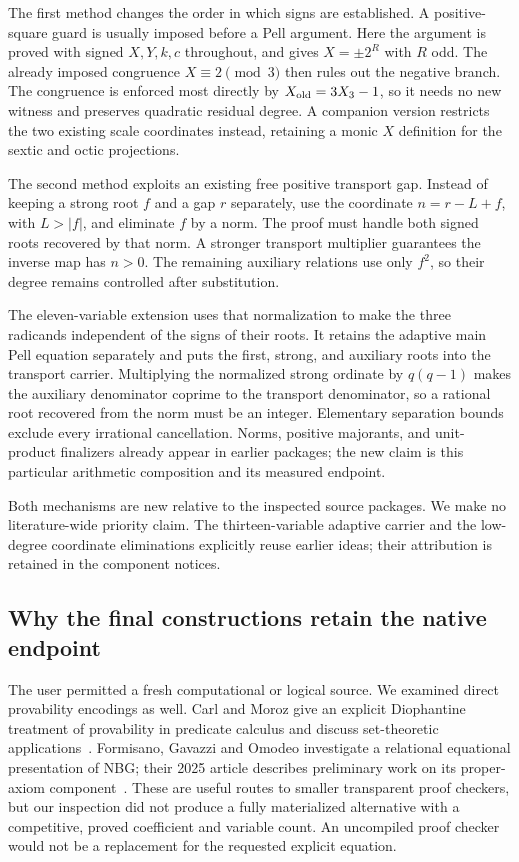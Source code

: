 \documentclass[11pt,letterpaper]{article}
\theoremstyle{remark}
\begin{document}
The first method changes the order in which signs are established.  A
positive-square guard is usually imposed before a Pell argument.  Here
the argument is proved with signed $X,Y,k,c$ throughout, and gives
$X=\pm2^R$ with $R$ odd.  The already imposed congruence
$X\equiv2\pmod3$ then rules out the negative branch.  The congruence is
enforced most directly by $X_{\rm old}=3X_3-1$, so it needs no
new witness and preserves quadratic residual degree.  A companion
version restricts the two existing scale coordinates instead, retaining
a monic $X$ definition for the sextic and octic projections.

The second method exploits an existing free positive transport gap.
Instead of keeping a strong root $f$ and a gap $r$ separately, use the
coordinate $n=r-L+f$, with $L>|f|$, and eliminate $f$ by a norm.  The
proof must handle both signed roots recovered by that norm.  A stronger
transport multiplier guarantees the inverse map has $n>0$.  The
remaining auxiliary relations use only $f^2$, so their degree remains
controlled after substitution.

The eleven-variable extension uses that normalization to make the three
radicands independent of the signs of their roots.  It retains the
adaptive main Pell equation separately and puts the first, strong, and
auxiliary roots into the transport carrier.  Multiplying the normalized
strong ordinate by $q(q-1)$ makes the auxiliary denominator coprime to
the transport denominator, so a rational root recovered from the norm
must be an integer.  Elementary separation bounds exclude every
irrational cancellation.  Norms, positive majorants, and unit-product
finalizers already appear in earlier packages; the new claim is this
particular arithmetic composition and its measured endpoint.

Both mechanisms are new relative to the inspected source packages.
We make no literature-wide priority claim.  The thirteen-variable
adaptive carrier and the low-degree coordinate eliminations explicitly
reuse earlier ideas; their attribution is retained in the component
notices.

\subsection{Why the final constructions retain the native endpoint}

The user permitted a fresh computational or logical source.  We examined
direct provability encodings as well.  Carl and Moroz give an explicit
Diophantine treatment of provability in predicate calculus and discuss
set-theoretic applications~\cite{carlmoroz}.  Formisano, Gavazzi and
Omodeo investigate a relational equational presentation of NBG; their
2025 article describes preliminary work on its proper-axiom
component~\cite{fgo}.  These are useful routes to smaller transparent
proof checkers, but our inspection did not produce a fully materialized
alternative with a competitive, proved coefficient and variable count.
An uncompiled proof checker would not be a replacement for the requested
explicit equation.
\end{document}
